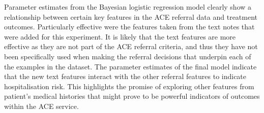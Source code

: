 Parameter estimates from the Bayesian logistic regression model clearly show a relationship between certain key features in the ACE referral data and treatment outcomes. Particularly effective were the features taken from the text notes that were added for this experiment. It is likely that the text features are more effective as they are not part of the ACE referral criteria, and thus they have not been specifically used when making the referral decisions that underpin each of the examples in the dataset. The parameter estimates of the final model indicate that the new text features interact with the other referral features to indicate hospitalisation risk. This highlights the promise of exploring other features from patient's medical histories that might prove to be powerful indicators of outcomes within the ACE service.

